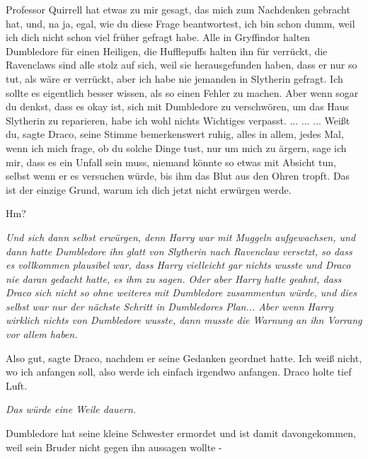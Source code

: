 \glqq{}Professor Quirrell hat etwas zu mir gesagt, das mich zum Nachdenken
gebracht hat, und, na ja, egal, wie du diese Frage beantwortest, ich bin schon
dumm, weil ich dich nicht schon viel früher gefragt habe. Alle in Gryffindor
halten Dumbledore für einen Heiligen, die Hufflepuffs halten ihn für verrückt,
die Ravenclaws sind alle stolz auf sich, weil sie herausgefunden haben, dass er
nur so tut, als wäre er verrückt, aber ich habe nie jemanden in Slytherin
gefragt. Ich sollte es eigentlich besser wissen, als so einen Fehler zu machen.
Aber wenn sogar du denkst, dass es okay ist, sich mit Dumbledore zu verschwören,
um das Haus Slytherin zu reparieren, habe ich wohl nichts Wichtiges
verpasst.\grqq{} ... ... ... \glqq{}Weißt du\grqq{}, sagte Draco, seine Stimme
bemerkenswert ruhig, alles in allem, \glqq{}jedes Mal, wenn ich mich frage, ob du
solche Dinge tust, nur um mich zu ärgern, sage ich mir, dass es ein Unfall sein
muss, niemand könnte so etwas mit Absicht tun, selbst wenn er es versuchen
würde, bis ihm das Blut aus den Ohren tropft. Das ist der einzige Grund, warum
ich dich jetzt nicht erwürgen werde.\grqq{}

\glqq{}Hm?\grqq{}

\emph{Und sich dann selbst erwürgen, denn Harry war mit Muggeln aufgewachsen,
und dann hatte Dumbledore ihn glatt von Slytherin nach Ravenclaw versetzt, so
dass es vollkommen plausibel war, dass Harry vielleicht gar nichts wusste und
Draco nie daran gedacht hatte, es ihm zu sagen. Oder aber Harry hatte geahnt,
dass Draco sich nicht so ohne weiteres mit Dumbledore zusammentun würde, und
dies selbst war nur der nächste Schritt in Dumbledores Plan... Aber wenn Harry
wirklich nichts von Dumbledore wusste, dann musste die Warnung an ihn Vorrang
vor allem haben.}

\glqq{}Also gut\grqq{}, sagte Draco, nachdem er seine Gedanken geordnet hatte.
\glqq{}Ich weiß nicht, wo ich anfangen soll, also werde ich einfach irgendwo
anfangen.\grqq{} Draco holte tief Luft.

\emph{Das würde eine Weile dauern.}

\glqq{}Dumbledore hat seine kleine Schwester ermordet und ist damit
davongekommen, weil sein Bruder nicht gegen ihn aussagen wollte -\grqq{}

